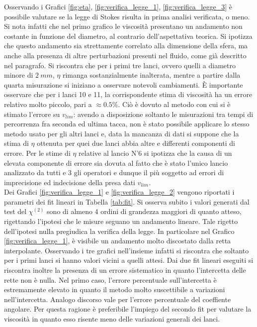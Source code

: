 \documentclass[a4paper,11pt,oneside]{article}
\begin{document}
Osservando i Grafici \ref{fig:eta}, \ref{fig:verifica_legge_1}, \ref{fig:verifica_legge_3} è possibile valutare se la legge di Stokes risulta in prima analisi verificata, o meno.
Si nota infatti che nel primo grafico le viscosità presentano un andamento non costante in funzione del diametro, al contrario dell'aspettativa teorica. Si ipotizza che questo andamento sia strettamente correlato alla dimensione della sfera, ma anche alla presenza di altre perturbazioni presenti nel fluido, come già descritto nel paragrafo.\newline
Si riscontra che per i primi tre lanci, ovvero quelli a diametro minore di $\SI{2}{mm}$, $\eta$ rimanga sostanzialmente inalterata, mentre a partire dalla quarta misurazione si iniziano a osservare notevoli cambiamenti. 
È importante osservare che per i lanci 10 e 11, la corrispondente stima di viscosità ha un errore relativo molto piccolo, pari a $\approx 0.5 \%$. Ciò è dovuto al metodo con cui si è stimato l'errore su $v_{lim}$: avendo a disposizione soltanto le misurazioni tra tempi di percorrenza fra seconda ed ultima tacca, non è stato possibile applicare lo stesso metodo usato per gli altri lanci e, data la mancanza di dati si suppone che la stima di $\eta$ ottenuta per quei due lanci abbia altre e differenti componenti di errore.
Per le stime di $\eta$ relative al lancio N'6 si ipotizza che la causa di un elevata componente di errore sia dovuta al fatto che è stato l'unico lancio analizzato da tutti e 3 gli operatori e dunque il più soggetto ad errori di imprecisione ed indecisione della presa dati $v_{lim}$.\\

Dei Grafici \ref{fig:verifica_legge_1} e \ref{fig:verifica_legge_2} vengono riportati i parametri dei fit lineari in Tabella \ref{tab:fit}. Si osserva subito i valori generati dal test del $\chi^{(2)}$ sono di almeno 4 ordini di grandezza maggiori di quanto atteso, rigettando l'ipotesi che le misure seguano un andamento lineare. Tale rigetto dell'ipotesi nulla pregiudica la verifica della legge. In particolare nel Grafico \ref{fig:verifica_legge_1}, è visibile un andamento molto discostato dalla retta interpolante.
Osservando i tre grafici nell'insieme infatti si riscontra che soltanto per i primi lanci si hanno valori vicini a quelli attesi.
Dai due fit lineari eseguiti si riscontra inoltre la presenza di un errore sistematico in quanto l'intercetta delle rette non è nulla. Nel primo caso, l'errore percentuale sull'intercetta è estremamente elevato in quanto il metodo molto suscettibile a variazioni nell'intercetta. Analogo discorso vale per l'errore percentuale del coeffiente angolare. Per questa ragione è preferibile l'impiego del secondo fit per valutare la viscosità in quanto esso risente meno delle variazioni generali dei lanci.
\end{document}
